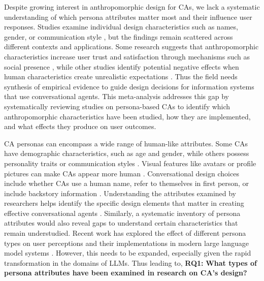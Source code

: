 \documentclass{article}
\begin{document}
Despite growing interest in anthropomorphic design for CAs, we lack a systematic understanding of which persona attributes matter most and their influence user responses. Studies examine individual design characteristics such as names, gender, or communication style \citep{go2019humanizing,seeger2021texting}, but the findings remain scattered across different contexts and applications. Some research suggests that anthropomorphic characteristics increase user trust and satisfaction through mechanisms such as social presence \citep{konya2023anthropomorphism,blut2021understanding}, while other studies identify potential negative effects when human characteristics create unrealistic expectations \citep{crolic2022blame,ciechanowski2019shades}. Thus the field needs synthesis of empirical evidence to guide design decisions for information systems that use conversational agents. This meta-analysis addresses this gap by systematically reviewing studies on persona-based CAs to identify which anthropomorphic characteristics have been studied, how they are implemented, and what effects they produce on user outcomes.

CA personas can encompass a wide range of human-like attributes. Some CAs have demographic characteristics, such as age and gender, while others possess personality traits or communication styles \citep{go2019humanizing}. Visual features like avatars or profile pictures can make CAs appear more human \citep{araujo2018living}. Conversational design choices include whether CAs use a human name, refer to themselves in first person, or include backstory information \citep{seeger2021texting}. Understanding the attributes examined by researchers helps identify the specific design elements that matter in creating effective conversational agents \citep{blut2021understanding}. Similarly, a systematic inventory of persona attributes would also reveal gaps to understand certain characteristics that remain understudied. Recent work has explored the effect of different persona types on user perceptions \citep{sun2024building} and their implementations in modern large language model systems \citep{chen2024trends}. However, this needs to be expanded, especially given the rapid transformation in the domains of LLMs. Thus leading to, \textbf{RQ1:} \textbf{What types of persona attributes have been examined in research on CA's design?}
\end{document}
